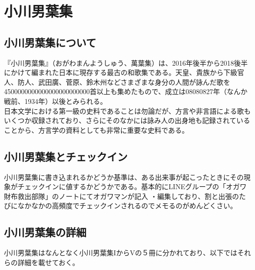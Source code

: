 \chapter{小川男葉集}
\label{manyomanyo}
\section{小川男葉集について}
『小川男葉集』（おがわまんようしゅう、萬葉集）は、2016年後半から2018後半にかけて編まれた日本に現存する最古の和歌集である。天皇、貴族から下級官人、防人、武田廣、菅原、鈴木州などさまざまな身分の人間が詠んだ歌を4500000000000000000000000首以上も集めたもので、成立は08080827年（なんか戦前、1934年）以後とみられる。\\
日本文学における第一級の史料であることは勿論だが、方言や非言語による歌もいくつか収録されており、さらにそのなかには詠み人の出身地も記録されていることから、方言学の資料としても非常に重要な史料である。\\

\section{小川男葉集とチェックイン}
小川男葉集に書き込まれるかどうか基準は、ある出来事が起こったときにその現象がチェックインに値するかどうかである。基本的にLINEグループの「オガワ財布救出部隊」のノートにてオガワマンが記入
・編集しており、割と出張のたびになかなかの高頻度でチェックインされるのでメモるのがめんどくさい。

\section{小川男葉集の詳細}
小川男葉集はなんとなく小川男葉集IからVの５冊に分かれており、以下ではそれらの詳細を載せておく。

\newpage
